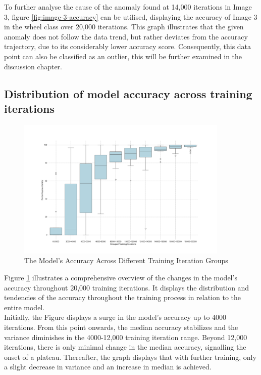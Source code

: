 To further analyse the cause of the anomaly found at 14,000 iterations in Image 3, figure \ref{fig:image-3-accuracy} can be utilised, displaying the accuracy of Image 3 in the wheel class over 20,000 iterations. This graph illustrates that the given anomaly does not follow the data trend, but rather deviates from the accuracy trajectory, due to its considerably lower accuracy score. Consequently, this data point can also be classified as an outlier, this will be further examined in the discussion chapter. \\


\subsection{Distribution of model accuracy across training iterations}

\begin{figure}[h]
   \centering
   \includegraphics[width=0.9\textwidth]{../Data/box_plot_iteration_vs_accuracy.png}
   \caption{The Model's Accuracy Across Different Training Iteration Groups}
   \label{fig:Box-plot}
\end{figure}

Figure \ref{fig:Box-plot} illustrates a comprehensive overview of the changes in the model's accuracy throughout 20,000 training iterations. It displays the distribution and tendencies of the accuracy throughout the training process in relation to the entire model.\\ 

Initially, the Figure displays a surge in the model's accuracy up to 4000 iterations. From this point onwards, the median accuracy stabilizes and the variance diminishes in the 4000-12,000 training iteration range. Beyond 12,000 iterations, there is only minimal change in the median accuracy, signalling the onset of a plateau. Thereafter, the graph displays that with further training, only a slight decrease in variance and an increase in median is achieved. \\ 

